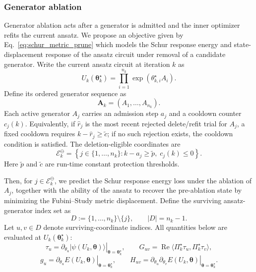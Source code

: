 \documentclass[
  reprint,
  amsmath,
  amssymb,
  aps,
  pra,
  nofootinbib,
  superscriptaddress,
  floatfix
]{revtex4-2}
\newcommand{\ket}[1]{|#1\rangle}
\begin{document}
\subsubsection{Generator ablation}
Generator ablation acts after a generator is admitted and the inner optimizer
refits the current ansatz.  We propose an objective given by
Eq.~\eqref{eq:schur_metric_prune} which models the Schur response energy and
state-displacement response of the ansatz circuit under removal of a candidate
generator.  Write the current ansatz circuit at iteration \(k\) as
\[
U_k(\boldsymbol\theta_k^\star)
=
\prod_{i=1}^{n_k}\exp(\theta_{k,i}^\star A_i).
\]
Define its ordered generator sequence as
\[
\mathbf A_k=(A_1,\ldots,A_{n_k}).
\]
Each active generator \(A_j\) carries an admission step \(a_j\) and a cooldown
counter \(c_j(k)\).  Equivalently, if \(\hat r_j\) is the most recent rejected
delete/refit trial for \(A_j\), a fixed cooldown requires
\(k-\hat r_j\ge\tilde c\); if no such rejection exists, the cooldown condition
is satisfied.  The deletion-eligible coordinates are
\begin{equation}
\mathcal E_k^\ominus
=
\left\{
j\in\{1,\ldots,n_k\}
:
k-a_j\ge \tilde p,\;
c_j(k)\le0
\right\}.
\label{eq:eligibility_set}
\end{equation}
Here \(\tilde p\) and \(\tilde c\) are run-time constant protection thresholds.

Then, for \(j\in\mathcal E_k^\ominus\), we predict the Schur response energy
loss under the ablation of \(A_j\), together with the ability of the ansatz to
recover the pre-ablation state by minimizing the Fubini--Study metric
displacement.  Define the surviving ansatz-generator index set as
\[
D:=\{1,\ldots,n_k\}\setminus\{j\},
\qquad
|D|=n_k-1 .
\]
Let \(u,v\in D\) denote surviving-coordinate indices.  All quantities below are
evaluated at \(U_k(\boldsymbol\theta_k^\star)\):
\[
\tau_u
=
\left.
\partial_{\theta_u}\ket{\psi(U_k,\boldsymbol\theta)}
\right|_{\boldsymbol\theta=\boldsymbol\theta_k^\star},
\qquad
G_{uv}
=
\operatorname{Re}\langle \Pi_k^\star\tau_u,\Pi_k^\star\tau_v\rangle,
\]
\[
g_u
=
\left.
\partial_{\theta_u}E(U_k,\boldsymbol\theta)
\right|_{\boldsymbol\theta=\boldsymbol\theta_k^\star},
\qquad
H_{uv}
=
\left.
\partial_{\theta_u}\partial_{\theta_v}E(U_k,\boldsymbol\theta)
\right|_{\boldsymbol\theta=\boldsymbol\theta_k^\star}.
\]
\end{document}
